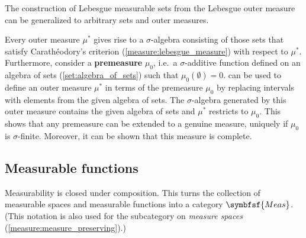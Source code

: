     The construction of Lebesgue measurable sets from the Lebesgue outer measure can be generalized to arbitrary sets and outer measures.
    \begin{construct}\label{measure:caratheodory}
        Every outer measure $\mu^*$ gives rise to a $\sigma$-algebra consisting of those sets that satisfy Carath\'eodory's criterion (\cref{measure:lebesgue_measure}) with respect to $\mu^*$. Furthermore, consider a \textbf{premeasure} $\mu_0$, i.e.~a $\sigma$-additive function defined on an algebra of sets (\cref{set:algebra_of_sets}) such that $\mu_0(\emptyset) = 0$.  can be used to define an outer measure $\mu^*$ in terms of the premeasure $\mu_0$ by replacing intervals with elements from the given algebra of sets. The $\sigma$-algebra generated by this outer measure contains the given algebra of sets and $\mu^*$ restricts to $\mu_0$. This shows that any premeasure can be extended to a genuine measure, uniquely if $\mu_0$ is $\sigma$-finite. Moreover, it can be shown that this measure is complete.
    \end{construct}

\subsection{Measurable functions}

    \begin{property}
        Measurability is closed under composition. This turns the collection of measurable spaces and measurable functions into a category $\symbfsf{Meas}$. (This notation is also used for the subcategory on \textit{measure spaces} (\cref{measure:measure_preserving}).)
    \end{property}



